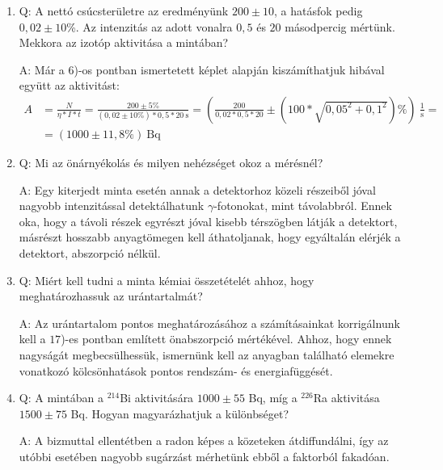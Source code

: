\begin{enumerate}
    \item Q: A nettó csúcsterületre az eredményünk $200 \pm 10$, a hatásfok pedig $0,02 \pm 10$\%. Az intenzitás az adott vonalra $0,5$ és $20$ másodpercig mértünk. Mekkora az izotóp aktivitása a mintában?
    \begin{displayquote}
        A: Már a $6$)-os pontban ismertetett képlet alapján kiszámíthatjuk hibával együtt az aktivitást:
        \begin{align}
            A
            &=
            \frac{N}{\eta * I * t}
            =
            \frac{200 \pm 5\%}{\left( 0,02 \pm 10\% \right) * 0,5 * 20\ \text{s}}
            =
            \left( \frac{200}{0,02 * 0,5 * 20} \pm \left( 100 * \sqrt{0,05^{2} + 0,1^{2}} \right)\% \right)\ \frac{1}{\text{s}}
            = \nonumber \\
            &=
            \left( 1000 \pm 11,8\% \right)\ \text{Bq}
        \end{align}
    \end{displayquote}
    
    \item Q: Mi az önárnyékolás és milyen nehézséget okoz a mérésnél?
    \begin{displayquote}
        A: Egy kiterjedt minta esetén annak a detektorhoz közeli részeiből jóval nagyobb intenzitással detektálhatunk $\gamma$-fotonokat, mint távolabbról. Ennek oka, hogy a távoli részek egyrészt jóval kisebb térszögben látják a detektort, másrészt hosszabb anyagtömegen kell áthatoljanak, hogy egyáltalán elérjék a detektort, abszorpció nélkül.
    \end{displayquote}
    
    \item Q: Miért kell tudni a minta kémiai összetételét ahhoz, hogy meghatározhassuk az urántartalmát?
    \begin{displayquote}
        A: Az urántartalom pontos meghatározásához a számításainkat korrigálnunk kell a $17$)-es pontban említett önabszorpció mértékével. Ahhoz, hogy ennek nagyságát megbecsülhessük, ismernünk kell az anyagban található elemekre vonatkozó kölcsönhatások pontos rendszám- és energiafüggését.
    \end{displayquote}
    
    \item Q: A mintában a $^{214}$Bi aktivitására $1000 \pm 55$ Bq, míg a $^{226}$Ra aktivitása $1500 \pm 75$ Bq. Hogyan magyarázhatjuk a különbséget?
    \begin{displayquote}
        A: A bizmuttal ellentétben a radon képes a közeteken átdiffundálni, így az utóbbi esetében nagyobb sugárzást mérhetünk ebből a faktorból fakadóan.
    \end{displayquote}
    

\end{enumerate}
